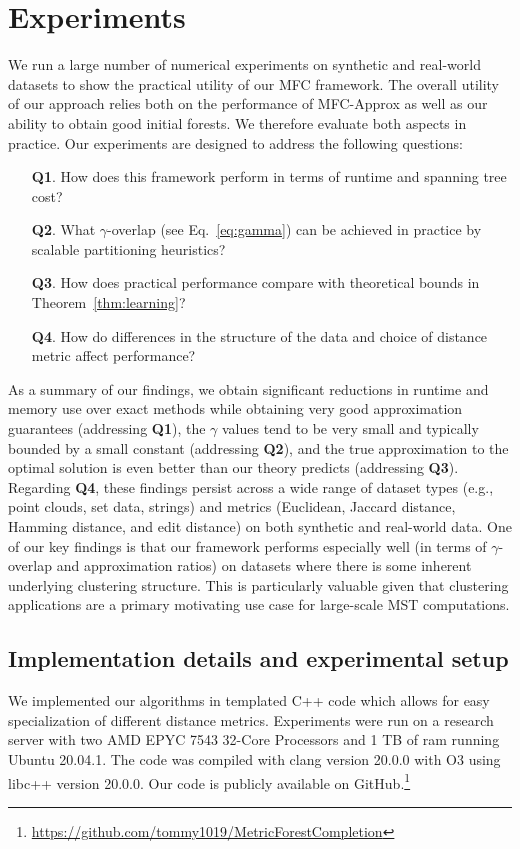 \section{Experiments}
We run a large number of numerical experiments on synthetic and real-world datasets to show the practical utility of our MFC framework.
The overall utility of our approach relies both on the performance of \textsf{MFC-Approx} as well as our ability to obtain good initial forests. We therefore evaluate both aspects in practice. Our experiments are designed to address the following questions:
\begin{itemize}[leftmargin=30pt,itemsep = 0pt]
	\item[\textbf{Q1}.] How does this framework perform in terms of runtime and spanning tree cost?
	\item[\textbf{Q2}.] What $\gamma$-overlap (see Eq.~\ref{eq:gamma}) can be achieved in practice by scalable partitioning heuristics?
	\item[\textbf{Q3}.] How does practical performance compare with theoretical bounds in Theorem~\ref{thm:learning}?
	\item[\textbf{Q4}.] How do differences in the structure of the data and choice of distance metric affect performance?
\end{itemize}
As a summary of our findings, we obtain significant reductions in runtime and memory use over exact methods while obtaining very good approximation guarantees (addressing \textbf{Q1}), the $\gamma$ values tend to be very small and typically bounded by a small constant (addressing \textbf{Q2}), and the true approximation to the optimal solution is even better than our theory predicts (addressing \textbf{Q3}). Regarding \textbf{Q4}, these findings persist across a wide range of dataset types (e.g., point clouds, set data, strings) and metrics (Euclidean, Jaccard distance, Hamming distance, and edit distance) on both synthetic and real-world data. One of our key findings is that our framework performs especially well (in terms of $\gamma$-overlap and approximation ratios) on datasets where there is some inherent underlying clustering structure. This is particularly valuable given that clustering applications are a primary motivating use case for large-scale MST computations.


\subsection{Implementation details and experimental setup}
We implemented our algorithms in templated C++ code which allows for easy specialization of different distance metrics. Experiments were run on a research server with two AMD EPYC 7543 32-Core Processors and 1 TB of ram running Ubuntu 20.04.1. The code was compiled with clang version 20.0.0 with O3 using libc++ version 20.0.0. Our code is publicly available on GitHub.\footnote{\url{https://github.com/tommy1019/MetricForestCompletion}}

